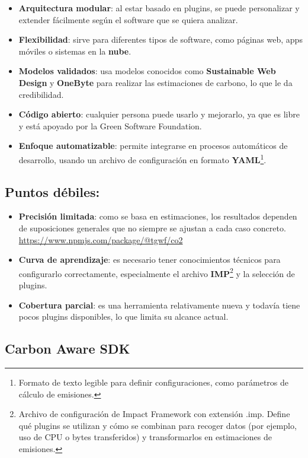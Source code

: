 \documentclass[12pt,a4paper]{report}
\begin{document}
\begin{itemize}
  \item \textbf{Arquitectura modular}: al estar basado en plugins, se puede personalizar y extender fácilmente según el software que se quiera analizar.
  \item \textbf{Flexibilidad}: sirve para diferentes tipos de software, como páginas web, apps móviles o sistemas en la \textbf{nube}.
  \item \textbf{Modelos validados}: usa modelos conocidos como \textbf{Sustainable Web Design} y \textbf{OneByte} para realizar las estimaciones de carbono, lo que le da credibilidad.
  \item \textbf{Código abierto}: cualquier persona puede usarlo y mejorarlo, ya que es libre y está apoyado por la Green Software Foundation.
  \item \textbf{Enfoque automatizable}: permite integrarse en procesos automáticos de desarrollo, usando un archivo de configuración en formato \textbf{YAML}\footnote{Formato de texto legible para definir configuraciones, como parámetros de cálculo de emisiones.}.
\end{itemize}

\subsection*{Puntos débiles:}

\begin{itemize}
  \item \textbf{Precisión limitada}: como se basa en estimaciones, los resultados dependen de suposiciones generales que no siempre se ajustan a cada caso concreto. \href{https://www.npmjs.com/package/@tgwf/co2}{https://www.npmjs.com/package/@tgwf/co2}
  \item \textbf{Curva de aprendizaje}: es necesario tener conocimientos técnicos para configurarlo correctamente, especialmente el archivo \textbf{IMP}\footnote{Archivo de configuración de Impact Framework con extensión .imp. Define qué plugins se utilizan y cómo se combinan para recoger datos (por ejemplo, uso de CPU o bytes transferidos) y transformarlos en estimaciones de emisiones.} y la selección de plugins.
  \item \textbf{Cobertura parcial}: es una herramienta relativamente nueva y todavía tiene pocos plugins disponibles, lo que limita su alcance actual.
\end{itemize}

\subsection*{Carbon Aware SDK}
\end{document}
